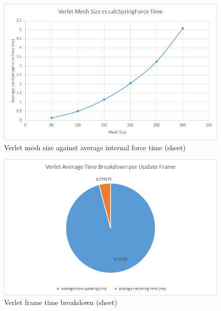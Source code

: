     \begin{figure}
    \begin{center}
      \includegraphics[scale=.9]{Figures/sheet_v_m_csf}
    \end{center}
    \caption{Verlet mesh size against average internal force time (sheet)}
    \label{fig:v mesh csf sheet}
  \end{figure}
  
    \begin{figure}
    \begin{center}
      \includegraphics[scale=.9]{Figures/sheet_v_ft}
    \end{center}
    \caption{Verlet frame time breakdown (sheet)}
    \label{fig:v ft sheet}
  \end{figure}
  
